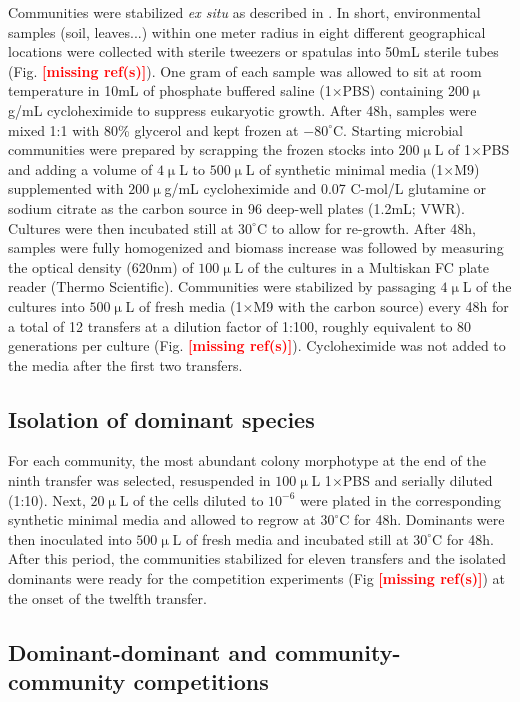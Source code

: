 \documentclass[a4paper,10pt]{article}
\newcommand{\mr}{\textcolor{red}{\textbf{[missing ref(s)]}}}
\begin{document}
Communities were stabilized \textit{ex situ} as described in \cite{Goldford2018}.
In short, environmental samples (soil, leaves...) within one meter radius in eight different
geographical locations were collected with sterile
tweezers or spatulas into 50mL sterile tubes (Fig. \mr).
One gram of each sample was allowed to
sit at room temperature in 10mL of phosphate buffered saline (1$\times$PBS) containing
200$\upmu$g/mL cycloheximide to suppress eukaryotic growth.
After 48h, samples were mixed 1:1 with 80\% glycerol and kept frozen at $-80^\circ$C.
Starting microbial communities were prepared by scrapping the frozen stocks into
$200\upmu$L of 1$\times$PBS and adding a volume of $4\upmu$L to $500\upmu$L
of synthetic minimal media (1$\times$M9) supplemented with $200\upmu$g/mL cycloheximide
and 0.07 C-mol/L glutamine or sodium citrate as the carbon source in 96 deep-well plates
(1.2mL; VWR).
Cultures were then incubated still at $30^\circ$C to allow for re-growth.
After 48h, samples were fully homogenized and biomass increase was followed by measuring
the optical density (620nm) of $100\upmu$L of the cultures in a Multiskan FC plate reader
(Thermo Scientific).
Communities were stabilized \cite{Goldford2018} by passaging $4\upmu$L of the cultures into
$500\upmu$L of fresh media (1$\times$M9 with the carbon source)  every 48h for a total of
12 transfers at a dilution factor of 1:100,
roughly equivalent to 80 generations per culture (Fig. \mr).
Cycloheximide was not added to the media after the first two transfers.

\subsection*{Isolation of dominant species}\label{methods:dominants}

For each community, the most abundant colony morphotype at the end of the ninth transfer
was selected, resuspended in $100\upmu$L 1$\times$PBS and serially diluted (1:10).
Next, $20\upmu$L of the cells diluted to $10^{-6}$ were plated in the corresponding synthetic
minimal media and allowed to regrow at $30^\circ$C for 48h. Dominants were then inoculated
into $500\upmu$L of fresh media and incubated still at $30^\circ$C for 48h.
After this period, the communities stabilized for eleven transfers and the isolated dominants
were ready for the competition experiments (Fig \mr) at the onset of the twelfth transfer.

\subsection*{Dominant-dominant and community-community competitions}
\label{methods:competitions}
\end{document}
